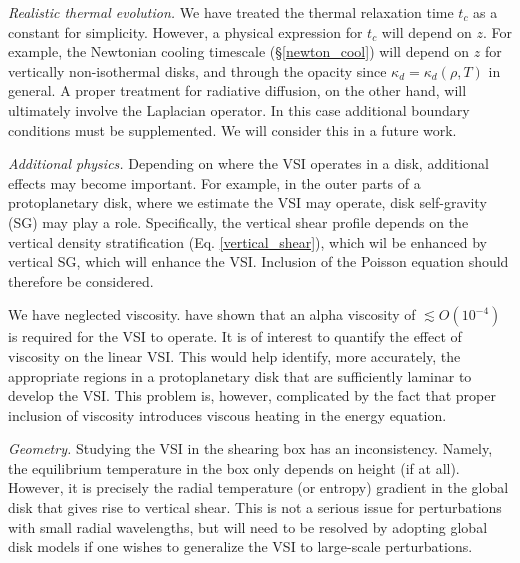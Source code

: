 \emph{Realistic thermal evolution.} We have treated the thermal
relaxation time $t_c$ as a constant for simplicity. However, a
physical expression for $t_c$ will depend on 
$z$. For example, the Newtonian cooling timescale
(\S\ref{newton_cool}) will depend on $z$ for vertically non-isothermal
disks, and through the opacity since 
$\kappa_d=\kappa_d(\rho,T)$ in general. 
A proper treatment for radiative diffusion, on the other hand, will
ultimately involve the Laplacian operator. In this case additional
boundary conditions must be supplemented. We will consider this in a
future work.  

\emph{Additional physics.} Depending on where the VSI operates in a
disk, additional effects may become important. For example, in the
outer parts of a protoplanetary disk, where we estimate the VSI may
operate, disk self-gravity (SG) may play a role. Specifically, the vertical
shear profile depends on the vertical density stratification
(Eq. \ref{vertical_shear}), which wil be enhanced by vertical SG,
which will enhance the VSI. Inclusion of the Poisson equation should
therefore be considered. 

We have neglected viscosity. \cite{nelson13} have shown that an
alpha viscosity of $\lesssim O(10^{-4})$ is required for the VSI to
operate. It is of interest to quantify the effect of viscosity
on the linear VSI. This would help identify, more accurately, the
appropriate regions in a protoplanetary disk that are sufficiently
laminar to develop the VSI.  This problem is, however, complicated by
the fact that proper inclusion of viscosity introduces viscous heating
in the energy equation. 


\emph{Geometry.} Studying the VSI in the shearing box has an 
inconsistency. Namely, the equilibrium temperature in the
box only depends on height (if at all). However, it is precisely the
radial temperature (or entropy) gradient in the global disk that
gives rise to vertical shear. This is not a serious issue for
perturbations with small radial wavelengths, 
but will need to be resolved by adopting global disk models  
if one wishes to generalize the VSI to large-scale perturbations. 




